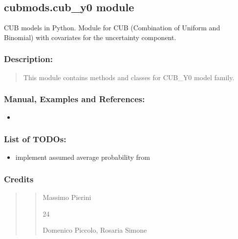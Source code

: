 \documentclass[letterpaper,10pt,english]{sphinxmanual}
\begin{document}
\subsection{cubmods.cub\_y0 module}
\label{\detokenize{cubmods:module-cubmods.cub_y0}}\label{\detokenize{cubmods:cubmods-cub-y0-module}}\label{\detokenize{cubmods:cuby0-module}}
\sphinxAtStartPar
CUB models in Python.
Module for CUB (Combination of Uniform
and Binomial) with covariates for the uncertainty component.


\subsubsection{Description:}
\label{\detokenize{cubmods:id6}}\begin{quote}

\sphinxAtStartPar
This module contains methods and classes
for CUB\_Y0 model family.
\end{quote}


\subsubsection{Manual, Examples and References:}
\label{\detokenize{cubmods:id7}}\begin{itemize}
\item {} 
\sphinxAtStartPar
{}

\end{itemize}


\subsubsection{List of TODOs:}
\label{\detokenize{cubmods:id8}}\begin{itemize}
\item {} 
\sphinxAtStartPar
implement assumed average probability from 

\end{itemize}


\subsubsection{Credits}
\label{\detokenize{cubmods:id9}}\begin{quote}
\begin{quote}\begin{description}
\sphinxAtStartPar
Massimo Pierini

\sphinxhyphen{}24

\sphinxAtStartPar
Domenico Piccolo, Rosaria Simone

\sphinxAtStartPar
{}

\end{description}\end{quote}
\end{quote}
\end{document}
